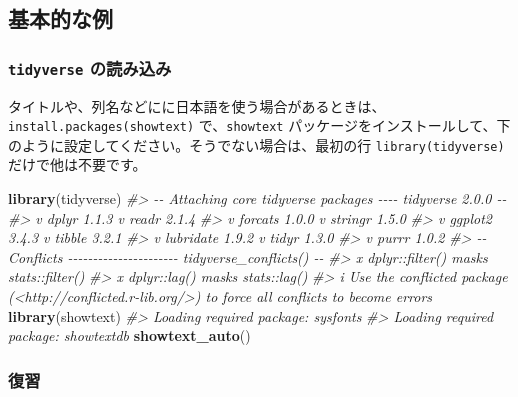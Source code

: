 \documentclass[
  xelatex, ja=standard]{bxjsbook}
\newenvironment{Shaded}{\begin{snugshade}}{\end{snugshade}}
\newcommand{\CommentTok}[1]{\textcolor[rgb]{0.56,0.35,0.01}{\textit{#1}}}
\newcommand{\FunctionTok}[1]{\textcolor[rgb]{0.13,0.29,0.53}{\textbf{#1}}}
\newcommand{\NormalTok}[1]{#1}
\theoremstyle{definition}
\theoremstyle{definition}
\theoremstyle{definition}
\theoremstyle{definition}
\theoremstyle{remark}
\begin{document}
\hypertarget{ux57faux672cux7684ux306aux4f8b}{%
\subsection{基本的な例}\label{ux57faux672cux7684ux306aux4f8b}}

\hypertarget{tidyverse-ux306eux8aadux307fux8fbcux307f}{%
\subsubsection{\texorpdfstring{\texttt{tidyverse} の読み込み}{tidyverse の読み込み}}\label{tidyverse-ux306eux8aadux307fux8fbcux307f}}

タイトルや、列名などにに日本語を使う場合があるときは、\texttt{install.packages(\textquotesingle{}showtext\textquotesingle{})} で、\texttt{showtext} パッケージをインストールして、下のように設定してください。そうでない場合は、最初の行 \texttt{library(tidyverse)} だけで他は不要です。

\begin{Shaded}
\begin{Highlighting}[]
\FunctionTok{library}\NormalTok{(tidyverse)}
\CommentTok{\#\textgreater{} {-}{-} Attaching core tidyverse packages {-}{-}{-}{-} tidyverse 2.0.0 {-}{-}}
\CommentTok{\#\textgreater{} v dplyr     1.1.3     v readr     2.1.4}
\CommentTok{\#\textgreater{} v forcats   1.0.0     v stringr   1.5.0}
\CommentTok{\#\textgreater{} v ggplot2   3.4.3     v tibble    3.2.1}
\CommentTok{\#\textgreater{} v lubridate 1.9.2     v tidyr     1.3.0}
\CommentTok{\#\textgreater{} v purrr     1.0.2     }
\CommentTok{\#\textgreater{} {-}{-} Conflicts {-}{-}{-}{-}{-}{-}{-}{-}{-}{-}{-}{-}{-}{-}{-}{-}{-}{-}{-}{-}{-}{-} tidyverse\_conflicts() {-}{-}}
\CommentTok{\#\textgreater{} x dplyr::filter() masks stats::filter()}
\CommentTok{\#\textgreater{} x dplyr::lag()    masks stats::lag()}
\CommentTok{\#\textgreater{} i Use the conflicted package (\textless{}http://conflicted.r{-}lib.org/\textgreater{}) to force all conflicts to become errors}
\FunctionTok{library}\NormalTok{(showtext) }
\CommentTok{\#\textgreater{} Loading required package: sysfonts}
\CommentTok{\#\textgreater{} Loading required package: showtextdb}
\FunctionTok{showtext\_auto}\NormalTok{()}
\end{Highlighting}
\end{Shaded}

\hypertarget{ux5fa9ux7fd2-1}{%
\subsubsection{復習}\label{ux5fa9ux7fd2-1}}
\end{document}
